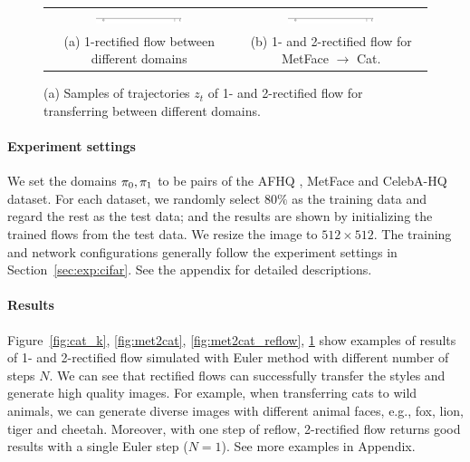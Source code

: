 \begin{figure}[h]
\begin{tabular}{cc}
     \\
     \hspace{3pt}\includegraphics[width=0.485\textwidth]{arxiv_figures/trajectory/axis.png} & 
     \hspace{3pt}\includegraphics[width=0.485\textwidth]{arxiv_figures/trajectory/axis.png} \\
     (a) 1-rectified flow between different domains & (b) 1- and 2-rectified flow for MetFace $\rightarrow$ Cat.  \\
     
\end{tabular}
    \caption{(a) Samples of  trajectories $z_t$ of 1- and 2-rectified flow for transferring between different domains. }
    \label{fig:met2cat_traj}
\end{figure}

    

\paragraph{Experiment settings}
We set the domains ${\pi}_0,{\pi}_1$ to be pairs of 
the AFHQ \citep{choi2020stargan}, MetFace \citep{karras2020training} and CelebA-HQ \citep{karras2018progressive} dataset. 
For each dataset, we randomly select $80\%$ as the training data and regard the rest as the test data; and the results are shown by initializing the trained flows from the test data.
We resize the image to $512 \times 512$.
The training and network configurations  
generally follow the experiment settings in Section~\ref{sec:exp:cifar}. See the appendix for detailed descriptions. 

\paragraph{Results}
Figure~\ref{fig:cat_k}, \ref{fig:met2cat}, \ref{fig:met2cat_reflow}, \ref{fig:met2cat_traj} 
show examples of results of 1- and 2-rectified flow simulated with Euler method with different number of steps $N$.  
We can see that rectified flows can successfully transfer the styles and generate high quality images. 
For example, when transferring cats to wild animals,  
we can generate diverse images with different animal faces, {e.g.}, fox, lion, tiger and cheetah. 
Moreover, with one step of reflow, 2-rectified flow returns good results with a single Euler step ($N=1$).  
See more examples in Appendix. 



